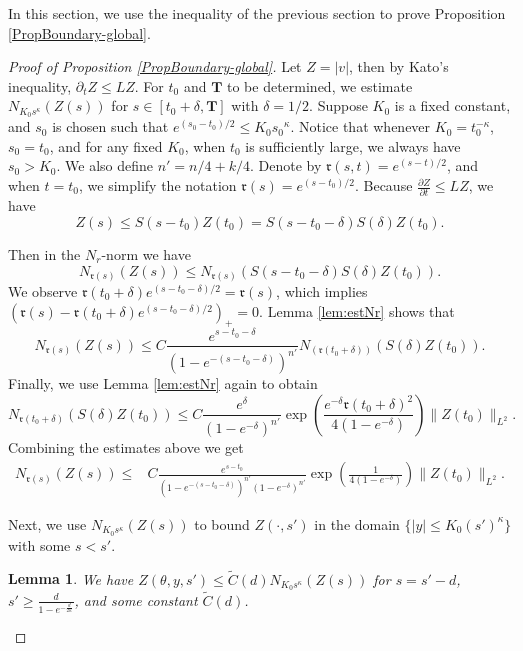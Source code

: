 \documentclass[11pt]{amsart}
\numberwithin{equation}{section}
\newtheorem{lemma}[theorem]{Lemma}
\numberwithin{equation}{section}
\newcommand{\mtr}{\mathfrak{r}}
\newcommand{\pr}{\partial}
\begin{document}
	In this section, we use the inequality of the previous section to prove Proposition \ref{PropBoundary-global}. 
	\begin{proof}[Proof of Proposition \ref{PropBoundary-global}]
		
		Let $Z=|v|$, then by Kato's inequality, $\pr_t Z\leq LZ$. For $t_0$ and $\mathbf T$ to be determined, we estimate $N_{K_0s^{\kappa}}(Z(s))$ for $s \in[t_0+\delta,\mathbf T]$ with $\delta=1/2$. Suppose $K_0$ is a fixed constant, and $s_0$ is chosen such that $e^{(s_0-t_0)/2}\leq K_0 {s_0}^{\kappa}$. Notice that whenever $K_0=t_0^{-\kappa}$, $s_0=t_0$, and for any fixed $K_0$, when $t_0$ is sufficiently large, we always have $s_0>K_0$. We also define $n'=n/4+k/4$. Denote by $\mtr(s,t)=e^{(s-t)/2}$, and when $t=t_0$, we simplify the notation $\mtr(s)=e^{(s-t_0)/2}$. Because $\frac{\pr Z}{\pr t}\leq LZ$, we have
		\[
		Z(s)\leq S(s-t_0)Z(t_0)=S(s-t_0-\delta)S(\delta)Z(t_0).
		\]
		
		Then in the $N_r$-norm we have
		\[
		N_{\mtr(s)}(Z(s))\leq
		N_{\mtr(s)} (S(s-t_0-\delta)S(\delta)Z(t_0)).
		\]
		We observe $\mtr(t_0+\delta)e^{(s-t_0-\delta)/2}=\mtr(s)$, which implies $(\mtr(s)-\mtr(t_0+\delta)e^{(s-t_0-\delta)/2})_+= 0$. Lemma \ref{lem:estNr} shows that
		\[
		N_{\mtr(s)}(Z(s))\leq 
		C\frac{e^{s-t_0-\delta}}{(1-e^{-(s-t_0-\delta)})^{n'}}
		N_{(\mtr(t_0+\delta))} (S(\delta)Z(t_0)).
		\]
		Finally, we use Lemma \ref{lem:estNr} again to obtain
		\[
		N_{\mtr(t_0+\delta)}(S(\delta)Z(t_0))
		\leq
		C\frac{e^{\delta}}{(1-e^{-\delta})^{n'}}\exp\left(\frac{e^{-\delta}\mtr(t_0+\delta)^2}{4(1-e^{-\delta})}\right)\|Z(t_0)\|_{L^2}.
		\]
		Combining the estimates above we get
		\begin{equation}\label{eq:NrboundbyL2}
			\begin{split}
				N_{\mtr(s)}(Z(s))\leq& C\frac{e^{s-t_0}}{(1-e^{-(s-t_0-\delta)})^{n'}(1-e^{-\delta})^{n'}}
				\exp\left(\frac{1}{4(1-e^{-\delta})}\right)\|Z(t_0)\|_{L^2}.
			\end{split}
		\end{equation}
		
		\medskip
		Next, we use $N_{K_0s^{\kappa}}(Z(s))$ to bound $Z(\cdot,s')$ in the domain $\{|y|\leq K_0(s')^\kappa\}$ with some $s<s'$. 
		
		
		\begin{lemma}\label{LmC0byL2}
			We have  
			$
			Z(\theta,y,s')\leq \tilde C(d)N_{K_0s^{\kappa}}(Z(s))
			$ for $s=s'-d$, $s'\geq \frac{d}{1-e^{-\frac{d}{2\kappa}}}$, and some constant $\tilde C(d)$.
		\end{lemma} 
		

\end{proof}
\end{document}
